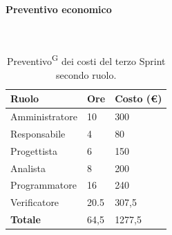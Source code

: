 \documentclass[8pt]{article}
\newcommand{\glossterm}[1]{#1\textsuperscript{G}} %
\newcommand{\subsubsubsection}[1]{\paragraph{#1}\mbox{}\\}
\begin{document}
\subsubsubsection{Preventivo economico}
\begin{table}[ht!]
	\centering
	\begin{tabular}{p{4cm} p{1cm} p{2cm}}
        \toprule
        \textbf{Ruolo} & \textbf{Ore} & \textbf{Costo (€)} \\
        \midrule
        Amministratore & 10 & 300 \\
        Responsabile & 4 & 80 \\
        Progettista & 6 & 150 \\
        Analista & 8 & 200 \\
        Programmatore & 16 & 240 \\
        Verificatore & 20.5 & 307,5 \\
        \midrule
        \textbf{Totale} & 64,5 & 1277,5 \\
        \bottomrule
    \end{tabular}
    \caption{\glossterm{Preventivo} dei costi del terzo Sprint secondo ruolo.}
	\label{table:Preventivo dei costi del terzo Sprint secondo ruolo}
\end{table}
\end{document}
